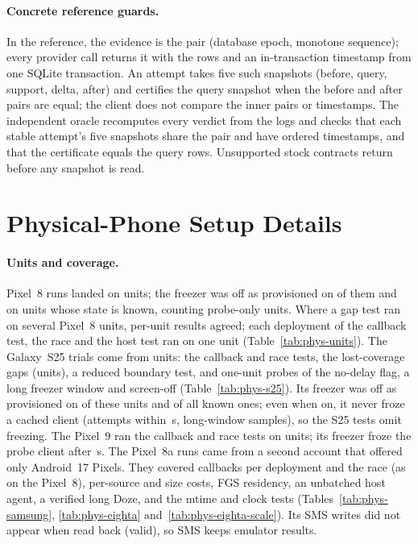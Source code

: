 \paragraph{Concrete reference guards.} In the reference, the evidence is the pair (database epoch, monotone sequence); every provider call returns it with the rows and an in-transaction timestamp from one SQLite transaction. An attempt takes five such snapshots (before, query, support, delta, after) and certifies the query snapshot when the before and after pairs are equal; the client does not compare the inner pairs or timestamps. The independent oracle recomputes every verdict from the logs and checks that each stable attempt's five snapshots share the pair and have ordered timestamps, and that the certificate equals the query rows. Unsupported stock contracts return \Unknown before any snapshot is read.

\section{Physical-Phone Setup Details}
\label{app:phys-setup}
\paragraph{Units and coverage.} Pixel~8 runs landed on \PhysUnitsTrials units; the freezer was off as provisioned on \PhysFreezerOffTrialUnits of them and on \PhysFreezerOffUnits units whose state is known, counting probe-only units. Where a gap test ran on several Pixel~8 units, per-unit results agreed; each deployment of the callback test, the race and the host test ran on one unit (Table~\ref{tab:phys-units}).\ifPhysSamsung{} The Galaxy~S25 trials come from \PhysSamsungUnits units: the callback and race tests, the lost-coverage gaps (\PhysSamsungGapUnits units), a reduced boundary test, and one-unit probes of the no-delay flag, a long freezer window and screen-off (Table~\ref{tab:phys-s25}). Its freezer was off as provisioned on \PhysSamsungFreezerOffTrialUnits of these units and \PhysSamsungFreezerOffUnits of all known ones; even when on, it never froze a cached client (\PhysSamsungFrozen attempts within \PhysSamsungFreezeWindowS\,s, \PhysSamsungLongAndroidFrozen long-window samples), so the S25 tests omit freezing.\fi\ifPhysNine{} The Pixel~9 ran the callback and race tests on \PhysNineUnits units; its freezer froze the probe client after \PhysNineProbeFrozenS\,s.\fi{} The Pixel~8a runs came from a second account that offered only Android~17 Pixels. They covered callbacks per deployment and the race (as on the Pixel~8), per-source and size costs, FGS residency, an unbatched host agent, a verified long Doze, and the mtime and clock tests (Tables~\ref{tab:phys-samsung}, \ref{tab:phys-eighta} and~\ref{tab:phys-eighta-scale}). Its SMS writes did not appear when read back (\PhysEightASmsValid valid), so SMS keeps emulator results.

